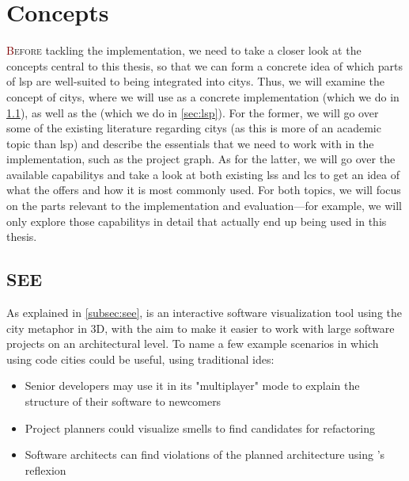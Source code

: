 \documentclass[../thesis]{subfiles}
\begin{document}
\chapter{Concepts}\label{ch:concepts}

\lettrine[lines=3]{\textcolor{Maroon}{B}}{efore} tackling the implementation, we need to take a closer look at the concepts central to this thesis, so that we can form a concrete idea of which parts of \gls{lsp} are well-suited to being integrated into \glspl{city}.
Thus, we will examine the concept of \glspl{city}, where we will use \SEE{} as a concrete implementation (which we do in \cref{sec:see}), as well as the  (which we do in \cref{sec:lsp}).
For the former, we will go over some of the existing literature regarding \glspl{city} (as this is more of an academic topic than \gls{lsp}) and describe the essentials that we need to work with in the implementation, such as the project graph.
As for the latter, we will go over the available \glspl{capability} and take a look at both existing \glspl{ls} and \glspl{lc} to get an idea of what the  offers and how it is most commonly used.
For both topics, we will focus on the parts relevant to the implementation and evaluation---for example, we will only explore those \glspl{capability} in detail that actually end up being used in this thesis.

\section{SEE}\label{sec:see}

As explained in \cref{subsec:see}, \SEE{} is an interactive software visualization tool using the \gls{city} metaphor in 3D, with the aim to make it easier to work with large software projects on an architectural level.
To name a few example scenarios in which using code cities could be useful,  using traditional \glspl{ide}:
\begin{itemize}
	\item Senior developers may use it in its "multiplayer" mode to explain the structure of their software to newcomers
	\item Project planners could visualize \glspl{smell} to find candidates for refactoring~\cite{galperin2021}
	\item Software architects can find violations of the planned architecture using \SEE{}'s \gls{reflexion}
\end{itemize}
\end{document}
